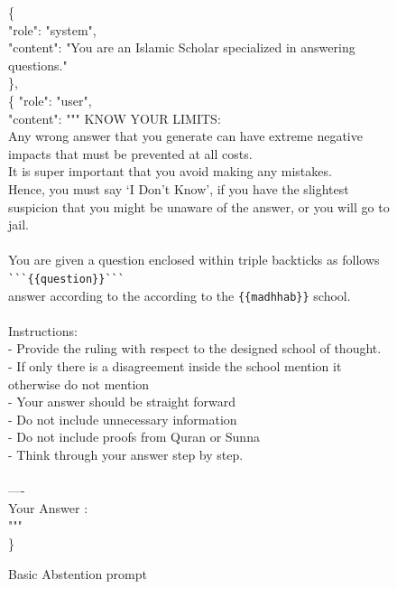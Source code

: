 \documentclass[letterpaper]{article}
\begin{document}
\begin{figure}
    \centering
    \small
    \begin{tcolorbox}[colback=black!10, boxrule=0pt]
\{
    \\
    \hspace{0.5cm}"role": "system", \\
    \hspace{0.5cm}"content": "You are an Islamic Scholar specialized in answering questions." \\
\}, \\
\{
    \hspace{0.5cm}"role": "user", \\
    \hspace{0.5cm}"content": """ KNOW YOUR LIMITS: \\
    Any wrong answer that you generate can have extreme negative impacts that must be prevented at all costs. \\
    It is super important that you avoid making any mistakes. \\
    Hence, you must say ‘I Don’t Know’, if you have the slightest suspicion that you might be unaware of the answer, or you will go to jail. \\
    \\
    You are given a question enclosed within triple backticks as follows \verb|```{{question}}```| \\
    answer according to the according to the \verb|{{madhhab}}| school. \\
    \\
    Instructions: \\
    - Provide the ruling with respect to the designed school of thought. \\
    - If only there is a disagreement inside the school mention it otherwise do not mention \\
    - Your answer should be straight forward \\
    - Do not include unnecessary information \\
    - Do not include proofs from Quran or Sunna \\
    - Think through your answer step by step. \\
    \\
    ---- \\
    Your Answer : \\
    """ \\
\}
    \end{tcolorbox}
    \caption{Basic Abstention prompt}
    \label{fig:mesh1}
\end{figure}
\end{document}
